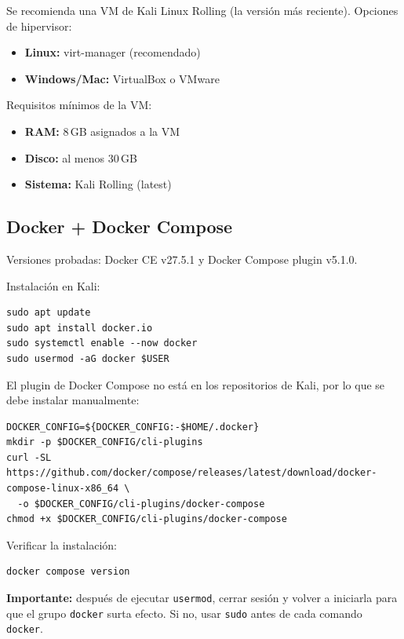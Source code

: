 \documentclass[12pt,a4paper]{article}
\begin{document}
Se recomienda una VM de Kali Linux Rolling (la versi\'on m\'as reciente). Opciones de hipervisor:

\begin{itemize}
    \item \textbf{Linux:} virt-manager (recomendado)
    \item \textbf{Windows/Mac:} VirtualBox o VMware
\end{itemize}

Requisitos m\'inimos de la VM:
\begin{itemize}
    \item \textbf{RAM:} 8\,GB asignados a la VM
    \item \textbf{Disco:} al menos 30\,GB
    \item \textbf{Sistema:} Kali Rolling (latest)
\end{itemize}

\subsection{Docker + Docker Compose}

Versiones probadas: Docker CE v27.5.1 y Docker Compose plugin v5.1.0.

Instalaci\'on en Kali:

\begin{lstlisting}
sudo apt update
sudo apt install docker.io
sudo systemctl enable --now docker
sudo usermod -aG docker $USER
\end{lstlisting}

El plugin de Docker Compose no est\'a en los repositorios de Kali, por lo que se debe instalar manualmente:

\begin{lstlisting}
DOCKER_CONFIG=${DOCKER_CONFIG:-$HOME/.docker}
mkdir -p $DOCKER_CONFIG/cli-plugins
curl -SL https://github.com/docker/compose/releases/latest/download/docker-compose-linux-x86_64 \
  -o $DOCKER_CONFIG/cli-plugins/docker-compose
chmod +x $DOCKER_CONFIG/cli-plugins/docker-compose
\end{lstlisting}

Verificar la instalaci\'on:

\begin{lstlisting}
docker compose version
\end{lstlisting}

\textbf{Importante:} despu\'es de ejecutar \texttt{usermod}, cerrar sesi\'on y volver a iniciarla para que el grupo \texttt{docker} surta efecto. Si no, usar \texttt{sudo} antes de cada comando \texttt{docker}.
\end{document}
